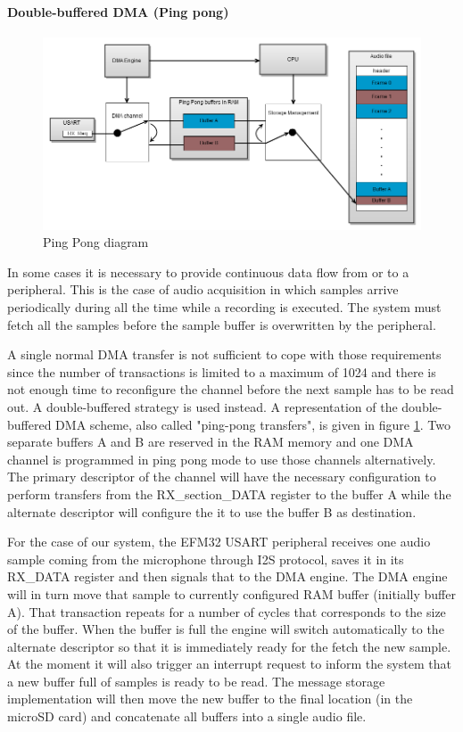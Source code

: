 \paragraph{Double-buffered DMA (Ping pong)}
\begin{figure}[htb]
\centering
\includegraphics[width=\textwidth]{Images/ping_pong}
\caption{Ping Pong diagram}
\label{fig:ping_pong}
\end{figure}
In some cases it is necessary to provide continuous data flow from or to a peripheral.  This is the case of audio acquisition in which samples arrive periodically during all the time while a recording is executed. The system must fetch all the samples before the sample buffer is overwritten by the peripheral.

A single normal DMA transfer is not sufficient to cope with those requirements since the number of transactions is limited to a maximum of 1024 and there is not enough time to reconfigure the channel before the next sample has to be read out. A double-buffered strategy is used instead.
A representation of the double-buffered DMA scheme, also called "ping-pong transfers", is given in figure \ref{fig:ping_pong}. Two separate buffers A and B are reserved in the RAM memory and one DMA channel is programmed in ping pong mode to use those channels alternatively. The primary descriptor of the channel will have the necessary configuration to perform transfers from the RX\_section\_DATA register to the buffer A while the alternate descriptor will configure the it to use the buffer B as destination.

For the case of our system, the EFM32 USART peripheral receives one audio sample coming from the microphone through I2S protocol, saves it in its RX\_DATA register and then signals that to the DMA engine. The DMA engine will in turn move that sample to currently configured RAM buffer (initially buffer A). That transaction repeats for a number of cycles that corresponds to the size of the buffer. When the buffer is full the engine will switch automatically to the alternate descriptor so that it is immediately ready for the fetch the new sample. At the moment it will also trigger an interrupt request to inform the system that a new buffer full of samples is ready to be read. The message storage implementation will then move the new buffer to the final location (in the microSD card) and concatenate all buffers into a single audio file.

